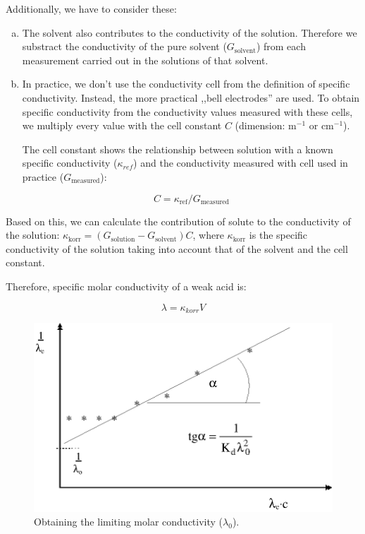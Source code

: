 Additionally, we have to consider these:

\begin{enumerate}[(a)]
\item The solvent also contributes to the conductivity of the solution. Therefore we substract the conductivity of the pure solvent ($G_{\text{solvent}}$) from each measurement carried out in the solutions of that solvent.

\item In practice, we don't use the conductivity cell from the definition of specific conductivity. Instead, the more practical ,,bell electrodes'' are used. To obtain specific conductivity from the conductivity values measured with these cells, we multiply every value with the cell constant $C$ (dimension:  m$^{-1}$ or cm$^{-1}$).

The cell constant shows the relationship between solution with a known specific conductivity ($\kappa_{ref}$) and the conductivity measured with cell used in practice ($G_{\text{measured}}$):

\begin{equation}
\label{eq:c}
	C
	=
	\kappa_{\text{ref}}/G_{\text{measured}}
\end{equation}

\end{enumerate}

Based on this, we can calculate the contribution of solute to the conductivity of the solution: $\kappa_{\text{korr}} = (G_{\text{solution}} - G_{\text{solvent}})C$, where $\kappa_{\text{korr}}$ is the specific conductivity of the solution taking into account that of the solvent and the cell constant.

Therefore, specific molar conductivity of a weak acid is:

\begin{equation}
\label{eq:c}
        \lambda
        =
        \kappa_{korr}
	V
\end{equation}


\begin{figure}[h!]
\centering
\includegraphics{lambda0.eps}
\caption{Obtaining the limiting molar conductivity ($\lambda_0$).}
\label{fig:}
\end{figure}

